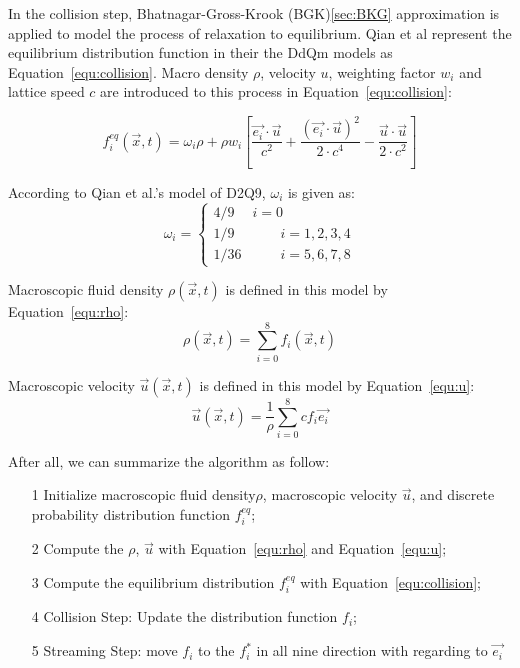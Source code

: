 In the collision step, Bhatnagar-Gross-Krook (BGK)\ref{sec:BKG} approximation is applied to model the process of relaxation to equilibrium. Qian et al represent the equilibrium distribution function in their the DdQm models as Equation~\ref{equ:collision}. Macro density $\rho$, velocity $u$, weighting factor $w_i$ and lattice speed $c$ are introduced to this process in Equation~\ref{equ:collision}:

\begin{equation}
\label{equ:collision}
    f_i^{eq}(\vec x, t) = \omega_i \rho + \rho w_i \left [  \frac{\vec{e_i}\cdot \vec u}{c^2} + \frac{(\vec{e_i}\cdot\vec u)^2 }{ 2 \cdot c^4 }-\frac{\vec u \cdot \vec u}{2 \cdot c^2} \right ]
\end{equation}

According to Qian et al.'s model of D2Q9, $\omega_i$ is given as:
\begin{equation}
    \omega_i = \left\{\begin{matrix}
4/9 & i=0\\ 
1/9&\quad \quad i=1,2,3,4\\ 
1/36&\quad \quad i=5,6,7,8 
\end{matrix}\right.
\end{equation}

Macroscopic fluid density $\rho (\vec x, t)$ is defined in this model by Equation~\ref{equ:rho}:
\begin{equation}
\label{equ:rho}
    \rho (\vec x, t) = \sum_{i=0}^{8} f_i(\vec x,t)
\end{equation}

Macroscopic velocity $\vec u(\vec x, t)$ is defined in this model by Equation~\ref{equ:u}:
\begin{equation}
\label{equ:u}
    \vec u (\vec x, t) = \frac{1}{\rho} \sum_{i=0}^{8}cf_i\vec{e_i}
\end{equation}

After all, we can summarize the algorithm as follow:
\begin{itemize}
  \item [1] Initialize macroscopic fluid density$\rho$, macroscopic velocity $\vec u$, and discrete probability distribution function $f_i^{eq}$;
  \item [2] Compute the $\rho$, $\vec u$ with Equation~\ref{equ:rho} and Equation~\ref{equ:u};
  \item [3] Compute the equilibrium distribution $f^{eq}_i$ with Equation~\ref{equ:collision};
  \item [4] Collision Step: Update the distribution function $f_i$;
  \item [5] Streaming Step: move $f_i$ to the $f_i^*$ in all nine direction with regarding to $\vec{e_i}$
\end{itemize}


